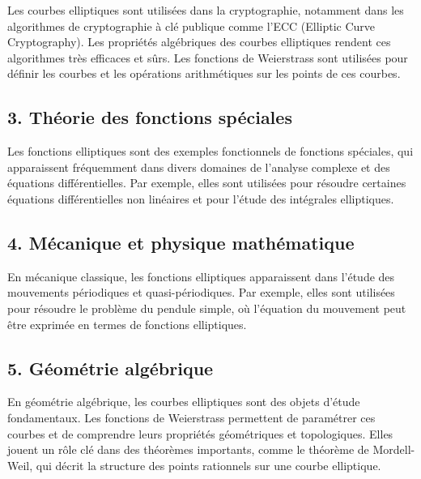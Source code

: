 \documentclass[12pt]{article}
\begin{document}
                        Les courbes elliptiques sont utilisées dans la cryptographie, notamment dans les algorithmes de cryptographie à clé publique comme l'ECC (Elliptic Curve Cryptography). Les propriétés algébriques des courbes elliptiques rendent ces algorithmes très efficaces et sûrs. Les fonctions de Weierstrass sont utilisées pour définir les courbes et les opérations arithmétiques sur les points de ces courbes.
                        
                        \subsection*{3. Théorie des fonctions spéciales}
                        
                        Les fonctions elliptiques sont des exemples fonctionnels de fonctions spéciales, qui apparaissent fréquemment dans divers domaines de l'analyse complexe et des équations différentielles. Par exemple, elles sont utilisées pour résoudre certaines équations différentielles non linéaires et pour l'étude des intégrales elliptiques.
                        
                        \subsection*{4. Mécanique et physique mathématique}
                        
                        En mécanique classique, les fonctions elliptiques apparaissent dans l'étude des mouvements périodiques et quasi-périodiques. Par exemple, elles sont utilisées pour résoudre le problème du pendule simple, où l'équation du mouvement peut être exprimée en termes de fonctions elliptiques.
                        
                        \subsection*{5. Géométrie algébrique}
                        
                        En géométrie algébrique, les courbes elliptiques sont des objets d'étude fondamentaux. Les fonctions de Weierstrass permettent de paramétrer ces courbes et de comprendre leurs propriétés géométriques et topologiques. Elles jouent un rôle clé dans des théorèmes importants, comme le théorème de Mordell-Weil, qui décrit la structure des points rationnels sur une courbe elliptique.
                        
\end{document}

